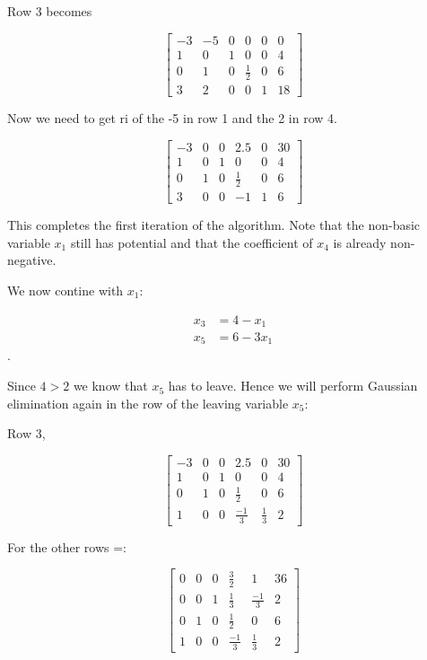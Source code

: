 Row 3 becomes

\[
	\left[
		\begin{array}{ccccc|c}
			-3 & -5 & 0 & 0           & 0 & 0  \\
			1  & 0  & 1 & 0           & 0 & 4  \\
			0  & 1  & 0 & \frac{1}{2} & 0 & 6  \\
			3  & 2  & 0 & 0           & 1 & 18
		\end{array}
		\right]
\]


Now we need to get ri of the -5 in row 1 and the 2 in  row 4.

\[
	\left[
		\begin{array}{ccccc|c}
			-3 & 0 & 0 & 2.5         & 0 & 30 \\
			1  & 0 & 1 & 0           & 0 & 4  \\
			0  & 1 & 0 & \frac{1}{2} & 0 & 6  \\
			3  & 0 & 0 & -1          & 1 & 6
		\end{array}
		\right]
\]

This completes the first iteration of the algorithm. Note that the non-basic variable \(x_1\) still has potential and that
the coefficient of \(x_4\) is already non-negative.

We now contine with \(x_1\):

\begin{align*}
	x_3 & = 4 - x_1  \\
	x_5 & = 6 - 3x_1
\end{align*}.

Since \(4 > 2\) we know that \(x_5\) has to leave. Hence we will perform Gaussian elimination again in the row of the leaving variable \(x_5\):

Row 3,

\[
	\left[
		\begin{array}{ccccc|c}
			-3 & 0 & 0 & 2.5          & 0           & 30 \\
			1  & 0 & 1 & 0            & 0           & 4  \\
			0  & 1 & 0 & \frac{1}{2}  & 0           & 6  \\
			1  & 0 & 0 & \frac{-1}{3} & \frac{1}{3} & 2
		\end{array}
		\right]
\]

For the other rows =:

\[
	\left[
		\begin{array}{ccccc|c}
			0 & 0 & 0 & \frac{3}{2}  & 1            & 36 \\
			0 & 0 & 1 & \frac{1}{3}  & \frac{-1}{3} & 2  \\
			0 & 1 & 0 & \frac{1}{2}  & 0            & 6  \\
			1 & 0 & 0 & \frac{-1}{3} & \frac{1}{3}  & 2
		\end{array}
		\right]
\]

